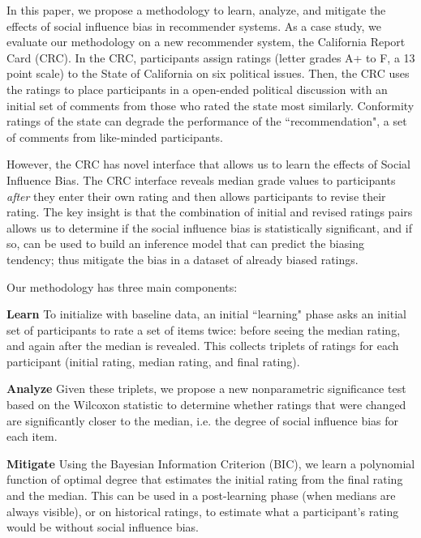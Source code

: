 In this paper, we propose a methodology to learn, analyze, 
and mitigate the effects of social influence bias in recommender systems.  
As a case study, we evaluate our methodology on a new recommender system, the 
California Report Card (CRC).
In the CRC, participants assign ratings (letter grades A+ to F, a 13 point
scale) to the State of California on six political issues.  
Then, the CRC uses the ratings to place participants in a open-ended
political discussion with an initial set of comments from those who 
rated the state most similarly.
Conformity ratings of the state can degrade the performance of the ``recommendation", 
a set of comments from like-minded participants.

However, the CRC has novel interface that allows us to learn the effects of Social Influence Bias.
The CRC interface reveals median grade values to participants \emph{after} they enter
their own rating and then allows participants to revise their
rating.
The key insight is that the combination of initial and revised ratings
pairs allows us to determine if the social influence bias is
statistically significant, and if so, can be used to build an
inference model that can predict the biasing tendency; thus mitigate the bias 
in a dataset of already biased ratings.  

Our methodology has three main components:
\vspace{1em}

\noindent \textbf{Learn} To initialize with baseline data, an initial
``learning" phase asks an initial set of participants to rate a set of
items twice: before seeing the median rating, and again after the
median is revealed.  This collects triplets of ratings for each
participant (initial rating, median rating, and final rating).

\vspace{1em}

\noindent \textbf{Analyze} Given these triplets, we propose a new
nonparametric significance test based on the Wilcoxon statistic to
determine whether ratings that were changed are significantly closer
to the median, i.e. the degree of social influence bias for each item.

\vspace{1em}

\noindent \textbf{Mitigate} Using the Bayesian Information Criterion
(BIC), we learn a polynomial function of optimal degree that estimates
the initial rating from the final rating and the median. This can be
used in a post-learning phase (when medians are always visible), or on
historical ratings, to estimate what a participant's rating would be
without social influence bias.

